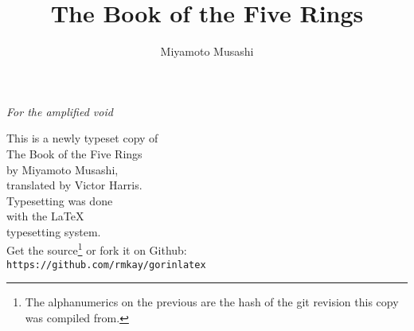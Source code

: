 \documentclass[paper=a6]{book}
\begin{document}
\pagestyle{empty}
\setcounter{secnumdepth}{-1} 
\setlength{\parindent}{0cm}




\vspace*{2cm}
\begin{center}
\textit{For the amplified void}
\end{center}
\cleardoublepage
\begin{figure}
\begin{alltt}
\singlespacing
\centering
\texttt{}
\end{alltt}
\end{figure}
\clearpage

\begin{center}
\vspace*{1cm}
This is a newly typeset copy of \\ 
The Book of the Five Rings\\ 
by Miyamoto Musashi,\\
translated by Victor Harris.\\
\vspace{2cm}
Typesetting was done \\ 
with the \LaTeX \\
typesetting system.\\
\vfill
Get the source\footnote{The alphanumerics on the previous are the hash of the git revision this copy was compiled from.} or fork it on Github:\\
\texttt{https://github.com/rmkay/gorinlatex}\\


\end{center}

\title{\textbf{The Book of the Five Rings}}
\author{Miyamoto Musashi}
\date{}
\maketitle
\end{document}
